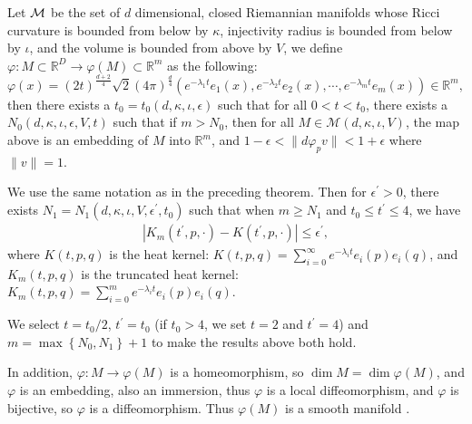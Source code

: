\begin{theorem}\cite[Thm. 5.1]{portegies2016embeddings}
	\label{embeddingthm}
Let $\mathcal{M}$ be the set of $d$ dimensional, closed Riemannian manifolds whose Ricci curvature is bounded from below by $\kappa$, injectivity radius is bounded from below by $\iota$, and the volume is bounded from above by $V$, we define $\varphi: M\subset \mathbb{R}^D \rightarrow \varphi(M) \subset \mathbb{R}^m$ as the following:
\begin{equation}
	\varphi(x)=(2t)^\frac{d+2}{4}\sqrt{2}(4\pi)^\frac{d}{4}(e^{-\lambda_1 t}e_1(x),e^{-\lambda_2 t}e_2(x),\cdots,e^{-\lambda_m t}e_m(x)) \in \mathbb{R}^m,
\end{equation}
then there exists a $t_0=t_0(d,\kappa,\iota,\epsilon)$ such that for all $0<t<t_0$, there exists a $N_0(d,\kappa,\iota,\epsilon,V,t)$ such that if $m>N_0$, then for all $M\in \mathcal{M}(d,\kappa,\iota,V)$, the map above is an embedding of $M$ into $\mathbb{R}^m$, and $1-\epsilon < \|d \varphi_p v\| < 1+\epsilon$ where $\|v\|=1$.
\end{theorem}


\begin{lemma}\cite[Lem. 3.2]{portegies2016embeddings}
	\label{kernelerror}
We use the same notation as in the preceding theorem. Then for $\epsilon^\prime>0$, there exists $N_1=N_1(d,\kappa,\iota,V,\epsilon^\prime,t_0)$ such that when $m\geq N_1$ and $t_0 \leq t^\prime\leq 4$, we have 
\begin{align}
	\left|K_m(t^\prime,p,\cdot)-K(t^\prime,p,\cdot)\right| \leq \epsilon^\prime,
\end{align}
where $K(t,p,q)$ is the heat kernel:
$K(t,p,q)=\sum_{i=0}^{\infty} e^{-\lambda_i t} e_i(p) e_i(q)$,
and $K_m(t,p,q)$ is the truncated heat kernel:
$K_m(t,p,q)=\sum_{i=0}^{m} e^{-\lambda_i t} e_i(p) e_i(q)$. 
\end{lemma}

We select $t=t_0/2$, $t^\prime = t_0$ (if $t_0>4$, we set $t=2$ and $t^\prime=4$) and $m=\max\left\{N_0,N_1\right\}+1$ to make the results above both hold.


In addition, $\varphi:M\rightarrow \varphi(M)$ is a homeomorphism, so $\dim M=\dim \varphi(M)$, and $\varphi$ is an embedding, also an immersion, thus $\varphi$ is a local diffeomorphism, and $\varphi$ is bijective, so $\varphi$ is a diffeomorphism. Thus $\varphi(M)$ is a smooth manifold \cite{lee2003introduction}.


